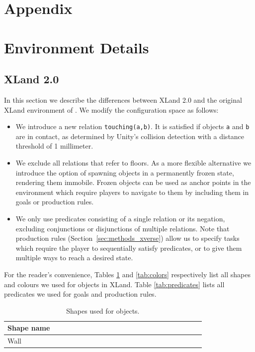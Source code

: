 \documentclass[11pt, a4paper, logo, copyright]{deepmind}
\begin{document}
\begin{appendix}
\section*{Appendix}
\section{Environment Details}
\subsection{XLand 2.0}
\label{app:xland_changes}
In this section we describe the differences between XLand 2.0 and the original XLand environment of \cite{xland}. We modify the configuration space as follows:
\begin{itemize}
    \item We introduce a new relation \texttt{touching(a,b)}. It is satisfied if objects \texttt{a} and \texttt{b} are in contact, as determined by Unity's collision detection with a distance threshold of 1 millimeter.
    \item We exclude all relations that refer to floors. As a more flexible alternative we introduce the option of spawning objects in a permanently frozen state, rendering them immobile. Frozen objects can be used as anchor points in the environment which require players to navigate to them by including them in goals or production rules.
    \item We only use predicates consisting of a single relation or its negation, excluding conjunctions or disjunctions of multiple relations. Note that production rules (Section~\ref{sec:methods_xverse}) allow us to specify tasks which require the player to sequentially satisfy predicates, or to give them multiple ways to reach a desired state.
\end{itemize}
For the reader's convenience, Tables \ref{tab:objects} and \ref{tab:colors} respectively list all shapes and colours we used for objects in XLand. Table \ref{tab:predicates} lists all predicates we used for goals and production rules.
\begin{longtable}{|p{0.25\linewidth}|p{0.1\linewidth}p{0.52\linewidth}}
    \caption{Shapes used for objects.}
    \label{tab:objects}
    \\ \hline
      \textbf{Shape name}\\
      \hline
      Wall \\
      \hline

\end{longtable}
\end{appendix}
\end{document}
